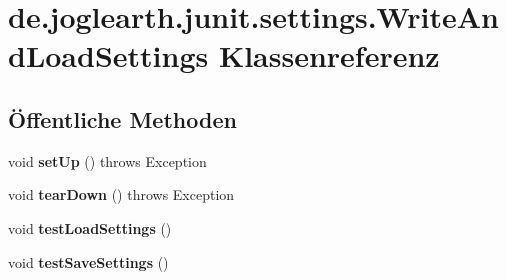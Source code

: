 \section{de.\-joglearth.\-junit.\-settings.\-Write\-And\-Load\-Settings Klassenreferenz}
\label{classde_1_1joglearth_1_1junit_1_1settings_1_1_write_and_load_settings}
\subsection*{Öffentliche Methoden}
\begin{DoxyCompactItemize}
\item 
void {\bfseries set\-Up} ()  throws Exception \label{classde_1_1joglearth_1_1junit_1_1settings_1_1_write_and_load_settings_a06e4efab84fcb9b0e8a253511a2643ce}

\item 
void {\bfseries tear\-Down} ()  throws Exception \label{classde_1_1joglearth_1_1junit_1_1settings_1_1_write_and_load_settings_afcf47dbb059815e87e0692590fc692fe}

\item 
void {\bfseries test\-Load\-Settings} ()\label{classde_1_1joglearth_1_1junit_1_1settings_1_1_write_and_load_settings_a11152fb7f2ccd35c23564ac98449fae0}

\item 
void {\bfseries test\-Save\-Settings} ()\label{classde_1_1joglearth_1_1junit_1_1settings_1_1_write_and_load_settings_aac9077c0328a8f344265a86e1fffd761}

\end{DoxyCompactItemize}
